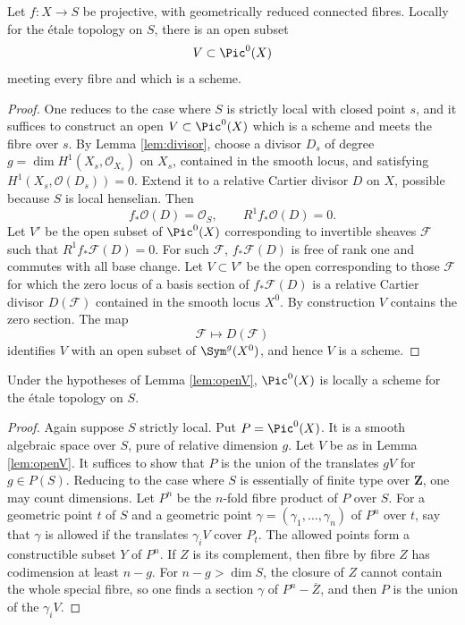 \begin{lemma}\label{lem:openV}
Let $f:X\to S$ be projective, with geometrically reduced connected fibres. Locally for the étale topology on $S$, there is an open subset
\[
  V\subset \Pic^0(X)
\]
meeting every fibre and which is a scheme.
\end{lemma}

\begin{proof}
One reduces to the case where $S$ is strictly local with closed point $s$, and it suffices to construct an open $V\subset\Pic^0(X)$ which is a scheme and meets the fibre over $s$. By Lemma \ref{lem:divisor}, choose a divisor $D_s$ of degree $g=\dim H^1(X_s,\mathcal O_{X_s})$ on $X_s$, contained in the smooth locus, and satisfying $H^1(X_s,\mathcal O(D_s))=0$. Extend it to a relative Cartier divisor $D$ on $X$, possible because $S$ is local henselian. Then
\[
  f_*\mathcal O(D)=\mathcal O_S,
  \qquad
  R^1 f_*\mathcal O(D)=0.
\]
Let $V'$ be the open subset of $\Pic^0(X)$ corresponding to invertible sheaves $\mathcal F$ such that $R^1f_*\mathcal F(D)=0$. For such $\mathcal F$, $f_*\mathcal F(D)$ is free of rank one and commutes with all base change. Let $V\subset V'$ be the open corresponding to those $\mathcal F$ for which the zero locus of a basis section of $f_*\mathcal F(D)$ is a relative Cartier divisor $D(\mathcal F)$ contained in the smooth locus $X^0$. By construction $V$ contains the zero section. The map
\[
  \mathcal F\longmapsto D(\mathcal F)
\]
identifies $V$ with an open subset of $\Sym^g(X^0)$, and hence $V$ is a scheme.
\end{proof}

\begin{lemma}\label{lem:pic-scheme}
Under the hypotheses of Lemma \ref{lem:openV}, $\Pic^0(X)$ is locally a scheme for the étale topology on $S$.
\end{lemma}

\begin{proof}
Again suppose $S$ strictly local. Put $P=\Pic^0(X)$. It is a smooth algebraic space over $S$, pure of relative dimension $g$. Let $V$ be as in Lemma \ref{lem:openV}. It suffices to show that $P$ is the union of the translates $gV$ for $g\in P(S)$. Reducing to the case where $S$ is essentially of finite type over $\mathbf Z$, one may count dimensions. Let $P^n$ be the $n$-fold fibre product of $P$ over $S$. For a geometric point $t$ of $S$ and a geometric point $\gamma=(\gamma_1,\ldots,\gamma_n)$ of $P^n$ over $t$, say that $\gamma$ is allowed if the translates $\gamma_iV$ cover $P_t$. The allowed points form a constructible subset $Y$ of $P^n$. If $Z$ is its complement, then fibre by fibre $Z$ has codimension at least $n-g$. For $n-g>\dim S$, the closure of $Z$ cannot contain the whole special fibre, so one finds a section $\gamma$ of $P^n-\overline Z$, and then $P$ is the union of the $\gamma_iV$.
\end{proof}

